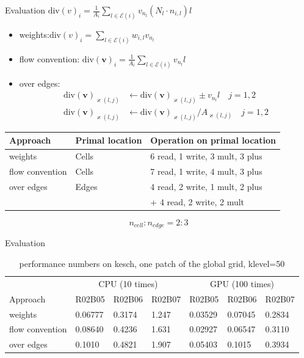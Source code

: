 \documentclass{beamer}
\begin{document}
\begin{frame}{Evaluation}
  $\text{div}(v)_i = \frac{1}{A_i}\sum\limits_{l\in \mathcal{E}(i)}v_{n_l}(N_l \cdot n_{i,l})l$
  \begin{itemize}
    \item weights:$\text{div}(v)_i = \sum\limits_{l\in \mathcal{E}(i)}w_{i,l}v_{n_l}$
    \item flow convention: $\text{div}(\bm{v})_i = \frac{1}{A_i}\sum\limits_{l\in\mathcal{E}(i)}v_{n_l}l$
    \item over edges:
    \begin{align}
      \text{div}(\bm{v})_{\varkappa(l,j)} &\leftarrow \text{div}(\bm{v})_{\varkappa(l,j)} \pm v_{n_l}l \quad j=1,2\\
      \text{div}(\bm{v})_{\varkappa(l,j)} &\leftarrow \text{div}(\bm{v})_{\varkappa(l,j)} / A_{\varkappa(l,j)}\quad j = 1,2
    \end{align}
  \end{itemize}

  \begin{table}[htbp]
  \centering
  \begin{tabular}{lll}
  \toprule
  Approach & Primal location & Operation on primal location\\
  \midrule
  weights & Cells & 6 read, 1 write, 3 mult, 3 plus\\
  flow convention & Cells & 7 read, 1 write, 4 mult, 3 plus\\
  over edges & Edges & 4 read, 2 write, 1 mult, 2 plus\\
  && + 4 read, 2 write, 2 mult\\
  \bottomrule
  \end{tabular}
  \end{table}
  \[n_{cell}:n_{edge} = 2:3\]
\end{frame}

\begin{frame}{Evaluation}
  \begin{footnotesize}
  \begin{table}[htbp]
  \centering
  \begin{tabular}{llll|lll}
  \toprule
  & \multicolumn {3}{c}{CPU (10 times)} & \multicolumn {3}{c}{GPU (100 times)}\\
  \cmidrule {2-7}
  Approach & R02B05 & R02B06 & R02B07 & R02B05 & R02B06 & R02B07\\
  \midrule
  weights & 0.06777 & 0.3174& 1.247 & 0.03529& 0.07045& 0.2834\\
  flow convention & 0.08640 & 0.4236& 1.631 & 0.02927& 0.06547& 0.3110\\
  over edges & 0.1010 & 0.4821& 1.907 & 0.05403& 0.1015& 0.3934\\
  \bottomrule
  \end{tabular}
  \caption{performance numbers on kesch, one patch of the global grid, klevel=50}
  \end{table}
\end{footnotesize}
\end{frame}
\end{document}
